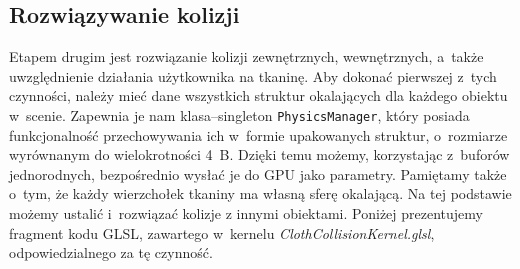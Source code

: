 		\subsection{Rozwiązywanie kolizji}
		\label{t:symulacja:dzialanie:kolizje}
			
		
		Etapem drugim jest rozwiązanie kolizji zewnętrznych, wewnętrznych, a~także uwzględnienie działania użytkownika na tkaninę. Aby dokonać pierwszej z~tych czynności, należy mieć dane wszystkich struktur okalających dla każdego obiektu w~scenie. Zapewnia je nam klasa--singleton \texttt{PhysicsManager}, który posiada funkcjonalność przechowywania ich w~formie upakowanych struktur, o~rozmiarze wyrównanym do wielokrotności 4~B. Dzięki temu możemy, korzystając z~buforów jednorodnych, bezpośrednio wysłać je do GPU jako parametry. Pamiętamy także o~tym, że każdy wierzchołek tkaniny ma własną sferę okalającą. Na tej podstawie możemy ustalić i~rozwiązać kolizje z innymi obiektami. Poniżej prezentujemy fragment kodu GLSL, zawartego w~kernelu \emph{ClothCollisionKernel.glsl}, odpowiedzialnego za tę czynność.
		
